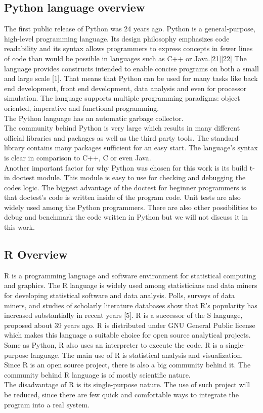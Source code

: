 \documentclass[
  twoside,
  12pt, a4paper,
  footinclude=true,
  headinclude=true,
  cleardoublepage=empty
]{article}
\begin{document}
\newpage
\subsection{Python language overview}
The first public release of Python was 24 years ago. Python is a general-purpose, high-level programming language. Its design philosophy emphasizes code readability and its syntax allows programmers to express concepts in fewer lines of code than would be possible in languages such as C++ or Java.[21][22] The language provides constructs intended to enable concise programs on both a small and large scale [1]. That means that Python can be used for many tasks like back end development, front end development, data analysis and even for processor simulation. The language supports multiple programming paradigms: object oriented, imperative and functional programming.\\ 
The Python language has an automatic garbage collector.\\
The community behind Python is very large which results in many different official libraries and packages as well as the third party tools. The standard library contains many packages sufficient for an easy start. The language's syntax is clear in comparison to C++, C or even Java.\\
Another important factor for why Python was chosen for this work is its build
t-in doctest module. This module is easy to use for checking and debugging the codes logic. The biggest advantage of the doctest for beginner programmers is that doctest's code is written inside of the program code. Unit tests are also widely used among the Python programmers. There are also other possibilities to debug and benchmark the code written in Python but we will not discuss it in this work.\\

\subsection{R Overview}
R is a programming language and software environment for statistical computing and graphics. The R language is widely used among statisticians and data miners for developing statistical software and data analysis. Polls, surveys of data miners, and studies of scholarly literature databases show that R's popularity has increased substantially in recent years [5]. R is a successor of the S language, proposed about 39 years ago. R is distributed under GNU General Public license which makes this language a suitable choice for open source analytical projects.\\
Same as Python, R also uses an interpreter to execute the code. R is a single-purpose language. The main use of R is statistical analysis and visualization. Since R is an open source project, there is also a big community behind it. The community behind R language is of mostly scientific nature.\\
The disadvantage of R is its single-purpose nature. The use of such project will be reduced, since there are few quick and comfortable ways to integrate the program into a real system.\\
\end{document}
